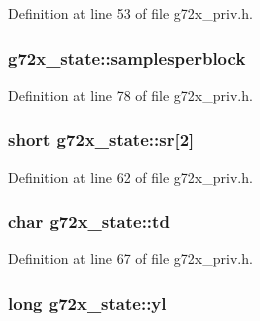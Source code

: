 Definition at line 53 of file g72x\+\_\+priv.\+h.

\subsubsection[{\texorpdfstring{samplesperblock}{samplesperblock}}]{ g72x\+\_\+state\+::samplesperblock}\hypertarget{structg72x__state_ad950cfa7f0088ed244266198834d5fb0}{}\label{structg72x__state_ad950cfa7f0088ed244266198834d5fb0}


Definition at line 78 of file g72x\+\_\+priv.\+h.

\subsubsection[{\texorpdfstring{sr}{sr}}]{\setlength{\rightskip}{0pt plus 5cm}short g72x\+\_\+state\+::sr\mbox{[}2\mbox{]}}\hypertarget{structg72x__state_a56fe911169dcc64da9b6854f60a42828}{}\label{structg72x__state_a56fe911169dcc64da9b6854f60a42828}


Definition at line 62 of file g72x\+\_\+priv.\+h.

\subsubsection[{\texorpdfstring{td}{td}}]{\setlength{\rightskip}{0pt plus 5cm}char g72x\+\_\+state\+::td}\hypertarget{structg72x__state_abade7a62852e6a8ec7fc171d053da56c}{}\label{structg72x__state_abade7a62852e6a8ec7fc171d053da56c}


Definition at line 67 of file g72x\+\_\+priv.\+h.

\subsubsection[{\texorpdfstring{yl}{yl}}]{\setlength{\rightskip}{0pt plus 5cm}long g72x\+\_\+state\+::yl}\hypertarget{structg72x__state_a807b5e84c2d64ee7776b2edca8de67f4}{}\label{structg72x__state_a807b5e84c2d64ee7776b2edca8de67f4}


